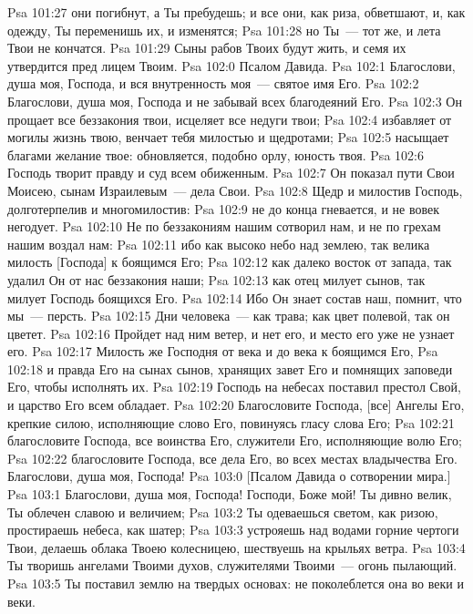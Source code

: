 \vs Psa 101:27 они погибнут, а Ты пребудешь; и все они, как риза, обветшают, и, как одежду, Ты переменишь их, и изменятся;
\vs Psa 101:28 но Ты~--- тот же, и лета Твои не кончатся.
\vs Psa 101:29 Сыны рабов Твоих будут жить, и семя их утвердится пред лицем Твоим.
\vs Psa 102:0 Псалом Давида.
\rsbpar\vs Psa 102:1 Благослови, душа моя, Господа, и вся внутренность моя~--- святое имя Его.
\vs Psa 102:2 Благослови, душа моя, Господа и не забывай всех благодеяний Его.
\vs Psa 102:3 Он прощает все беззакония твои, исцеляет все недуги твои;
\vs Psa 102:4 избавляет от могилы жизнь твою, венчает тебя милостью и щедротами;
\vs Psa 102:5 насыщает благами желание твое: обновляется, подобно орлу, юность твоя.
\vs Psa 102:6 Господь творит правду и суд всем обиженным.
\vs Psa 102:7 Он показал пути Свои Моисею, сынам Израилевым~--- дела Свои.
\vs Psa 102:8 Щедр и милостив Господь, долготерпелив и многомилостив:
\vs Psa 102:9 не до конца гневается, и не вовек негодует.
\vs Psa 102:10 Не по беззакониям нашим сотворил нам, и не по грехам нашим воздал нам:
\vs Psa 102:11 ибо как высоко небо над землею, так велика милость [Господа] к боящимся Его;
\vs Psa 102:12 как далеко восток от запада, так удалил Он от нас беззакония наши;
\vs Psa 102:13 как отец милует сынов, так милует Господь боящихся Его.
\vs Psa 102:14 Ибо Он знает состав наш, помнит, что мы~--- персть.
\vs Psa 102:15 Дни человека~--- как трава; как цвет полевой, так он цветет.
\vs Psa 102:16 Пройдет над ним ветер, и нет его, и место его уже не узнает его.
\vs Psa 102:17 Милость же Господня от века и до века к боящимся Его,
\vs Psa 102:18 и правда Его на сынах сынов, хранящих завет Его и помнящих заповеди Его, чтобы исполнять их.
\vs Psa 102:19 Господь на небесах поставил престол Свой, и царство Его всем обладает.
\vs Psa 102:20 Благословите Господа, [все] Ангелы Его, крепкие силою, исполняющие слово Его, повинуясь гласу слова Его;
\vs Psa 102:21 благословите Господа, все воинства Его, служители Его, исполняющие волю Его;
\vs Psa 102:22 благословите Господа, все дела Его, во всех местах владычества Его. Благослови, душа моя, Господа!
\vs Psa 103:0 [Псалом Давида о сотворении мира.]
\rsbpar\vs Psa 103:1 Благослови, душа моя, Господа! Господи, Боже мой! Ты дивно велик, Ты облечен славою и величием;
\vs Psa 103:2 Ты одеваешься светом, как ризою, простираешь небеса, как шатер;
\vs Psa 103:3 устрояешь над водами горние чертоги Твои, делаешь облака Твоею колесницею, шествуешь на крыльях ветра.
\vs Psa 103:4 Ты творишь ангелами Твоими духов, служителями Твоими~--- огонь пылающий.
\vs Psa 103:5 Ты поставил землю на твердых основах: не поколеблется она во веки и веки.
